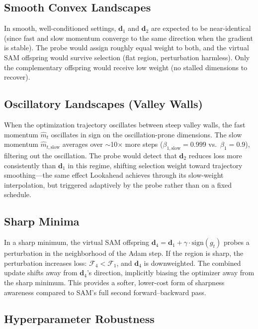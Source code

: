 \documentclass[12pt]{article}
\newcommand{\sign}{\mathrm{sign}}
\begin{document}
\subsection{Smooth Convex Landscapes}

In smooth, well-conditioned settings, $\mathbf{d}_1$ and
$\mathbf{d}_2$ are expected to be near-identical (since fast and slow
momentum converge to the same direction when the gradient is stable).
The probe would assign roughly equal weight to both, and the virtual
SAM offspring would survive selection (flat region, perturbation harmless).
Only the complementary offspring would receive low weight (no stalled
dimensions to recover).

\subsection{Oscillatory Landscapes (Valley Walls)}

When the optimization trajectory oscillates between steep valley walls,
the fast momentum $\hat{m}_t$ oscillates in sign on the
oscillation-prone dimensions.
The slow momentum $\hat{m}_{t,\mathrm{slow}}$ averages over
$\sim$10$\times$ more steps ($\beta_{1,\mathrm{slow}} = 0.999$ vs.\
$\beta_1 = 0.9$), filtering out the oscillation.
The probe would detect that $\mathbf{d}_2$ reduces loss more
consistently than $\mathbf{d}_1$ in this regime, shifting selection
weight toward trajectory smoothing---the same effect Lookahead achieves
through its slow-weight interpolation, but triggered adaptively by
the probe rather than on a fixed schedule.

\subsection{Sharp Minima}

In a sharp minimum, the virtual SAM offspring $\mathbf{d}_4 =
\mathbf{d}_1 + \gamma \cdot \sign(g_t)$ probes a perturbation in
the neighborhood of the Adam step.
If the region is sharp, the perturbation increases loss:
$\mathcal{F}_4 < \mathcal{F}_1$, and $\mathbf{d}_4$ is downweighted.
The combined update shifts away from $\mathbf{d}_4$'s direction,
implicitly biasing the optimizer away from the sharp minimum.
This provides a softer, lower-cost form of sharpness awareness
compared to SAM's full second forward--backward pass.

\subsection{Hyperparameter Robustness}
\end{document}
